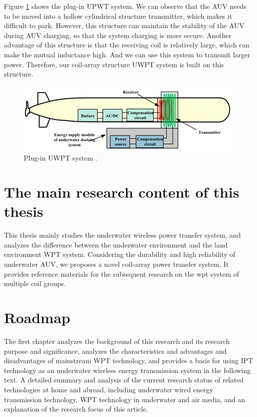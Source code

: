 Figure \ref{fig:plug in UWPT system} shows the plug-in UPWT system. We can observe that the AUV needs to be moved into a hollow cylindrical structure transmitter, which makes it difficult to park. However, this structure can maintain the stability of the AUV during AUV charging, so that the system charging is more secure. Another advantage of this structure is that the receiving coil is relatively large, which can make the mutual inductance high. And we can use this system to transmit larger power. Therefore, our coil-array structure UWPT system is built on this structure.
\begin{figure}[!t]
    \centering
    \includegraphics[width=0.7\linewidth]{images/1_plugin_UWPT_system.png}
    \caption{Plug-in UWPT system \cite{Wang2019}.}
    \label{fig:plug in UWPT system}
\end{figure}


\section{The main research content of this thesis}
This thesis mainly studies the underwater wireless power transfer system, and analyzes the difference between the underwater environment and the land environment WPT system. Considering the durability and high reliability of underwater AUV, we proposes a novel coil-array power transfer system. 
It provides reference materials for the subsequent research on the wpt system of multiple coil groups.

\section{Roadmap}
The first chapter analyzes the background of this research and its research purpose and significance, analyzes the characteristics and advantages and disadvantages of mainstream WPT technology, and provides a basis for using IPT technology as an underwater wireless energy transmission system in the following text. A detailed summary and analysis of the current research status of related technologies at home and abroad, including underwater wired energy transmission technology, WPT technology in underwater and air media, and an explanation of the research focus of this article.

